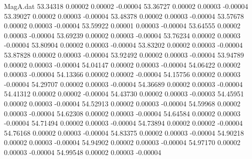 \begin{filecontents}{MagA.dat}
  53.34318    0.00002    0.00002   -0.00004
  53.36727    0.00002    0.00003   -0.00004
  53.39027    0.00002    0.00003   -0.00004
  53.48378    0.00002    0.00003   -0.00004
  53.57678    0.00002    0.00003   -0.00004
  53.59922    0.00001    0.00003   -0.00004
  53.64555    0.00002    0.00003   -0.00004
  53.69239    0.00002    0.00003   -0.00004
  53.76234    0.00002    0.00003   -0.00004
  53.80904    0.00002    0.00003   -0.00004
  53.83202    0.00002    0.00003   -0.00004
  53.87828    0.00002    0.00003   -0.00004
  53.92492    0.00002    0.00003   -0.00004
  53.94789    0.00002    0.00003   -0.00004
  54.04147    0.00002    0.00003   -0.00004
  54.06422    0.00002    0.00003   -0.00004
  54.13366    0.00002    0.00002   -0.00004
  54.15756    0.00002    0.00003   -0.00004
  54.29707    0.00002    0.00003   -0.00004
  54.36689    0.00002    0.00003   -0.00004
  54.41312    0.00002    0.00002   -0.00004
  54.43730    0.00002    0.00003   -0.00003
  54.45951    0.00002    0.00003   -0.00004
  54.52913    0.00002    0.00003   -0.00004
  54.59968    0.00002    0.00003   -0.00004
  54.62308    0.00002    0.00003   -0.00004
  54.64584    0.00002    0.00003   -0.00004
  54.71494    0.00002    0.00003   -0.00004
  54.73894    0.00002    0.00002   -0.00004
  54.76168    0.00002    0.00003   -0.00004
  54.83375    0.00002    0.00003   -0.00004
  54.90218    0.00002    0.00003   -0.00004
  54.94902    0.00002    0.00003   -0.00004
  54.97170    0.00002    0.00003   -0.00004
  54.99548    0.00002    0.00003   -0.00004
\end{filecontents}
